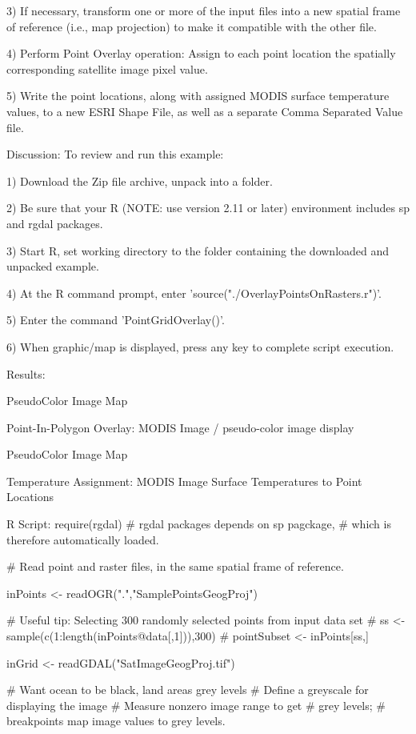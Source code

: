 3) If necessary, transform one or more of the input files into a new spatial frame of reference (i.e., map projection) to make it compatible with the other file.

4) Perform Point Overlay operation: Assign to each point location the spatially corresponding satellite image pixel value.

5) Write the point locations, along with assigned MODIS surface temperature values, to a new ESRI Shape File, as well as a separate Comma Separated Value file.

Discussion:
To review and run this example:

1) Download the Zip file archive, unpack into a folder.

2) Be sure that your R (NOTE: use version 2.11 or later) environment includes sp and rgdal packages.

3) Start R, set working directory to the folder containing the downloaded and unpacked example.

4) At the R command prompt, enter 'source("./OverlayPointsOnRasters.r")'.

5) Enter the command 'PointGridOverlay()'.

6) When graphic/map is displayed, press any key to complete script execution.

Results:
 

 PseudoColor Image Map

Point-In-Polygon Overlay: MODIS Image / pseudo-color image display

 

 PseudoColor Image Map

Temperature Assignment: MODIS Image Surface Temperatures to Point Locations

 

R Script:
   require(rgdal) # rgdal packages depends on sp pagckage,
                  # which is therefore automatically loaded.

# Read point and raster files, in the same spatial frame of reference.

   inPoints <- readOGR(".","SamplePointsGeogProj")

# Useful tip: Selecting 300 randomly selected points from input data set
#   ss <- sample(c(1:length(inPoints@data[,1])),300) 
#   pointSubset <- inPoints[ss,]

   inGrid <- readGDAL("SatImageGeogProj.tif")
   
# Want ocean to be black, land areas grey levels
# Define a greyscale for displaying the image
# Measure nonzero image range to get # grey levels;
# breakpoints map image values to grey levels.
   
